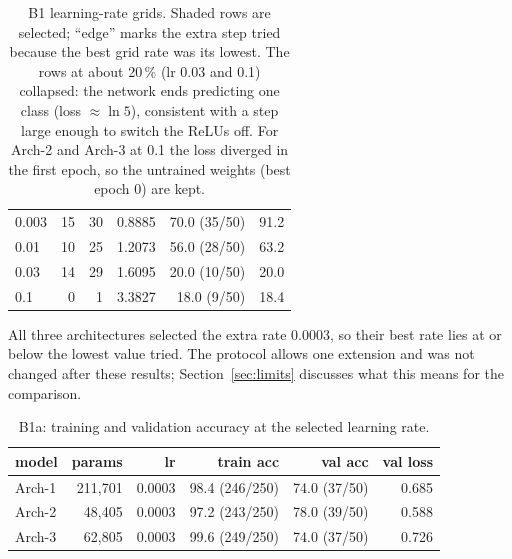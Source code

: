 \documentclass[11pt,a4paper]{article}
\begin{document}
\begin{table}[H]
\begin{subtable}{\linewidth}
\begin{tabular}{@{}lrrrrr@{}}
0.003 & 15 & 30 & 0.8885 & 70.0 (35/50) & 91.2 \\
0.01 & 10 & 25 & 1.2073 & 56.0 (28/50) & 63.2 \\
0.03 & 14 & 29 & 1.6095 & 20.0 (10/50) & 20.0 \\
0.1 & 0 & 1 & 3.3827 & 18.0 (9/50) & 18.4 \\
\bottomrule\end{tabular}\caption{Arch-3}\end{subtable}
\caption{B1 learning-rate grids.  Shaded rows are selected; ``edge'' marks the extra step tried
because the best grid rate was its lowest.  The rows at about 20\,\% (lr 0.03 and 0.1) collapsed:
the network ends predicting one class (loss $\approx \ln 5$), consistent with a step large enough to
switch the ReLUs off.  For Arch-2 and Arch-3 at 0.1 the loss diverged in the first epoch, so the
untrained weights (best epoch 0) are kept.}\label{tab:b1grid}
\end{table}

All three architectures selected the extra rate $0.0003$, so their best rate lies at or below the
lowest value tried.  The protocol allows one extension and was not changed after these results;
Section~\ref{sec:limits} discusses what this means for the comparison.

\begin{table}[H]\centering\small\begin{tabular}{@{}lrrrrr@{}}\toprule model & params & lr & train acc & val acc & val loss \\ \midrule
Arch-1 & 211,701 & 0.0003 & 98.4 (246/250) & 74.0 (37/50) & 0.685 \\
Arch-2 & 48,405 & 0.0003 & 97.2 (243/250) & 78.0 (39/50) & 0.588 \\
Arch-3 & 62,805 & 0.0003 & 99.6 (249/250) & 74.0 (37/50) & 0.726 \\
\bottomrule\end{tabular}
\caption{B1a: training and validation accuracy at the selected learning rate.}\label{tab:b1acc}
\end{table}
\end{document}
